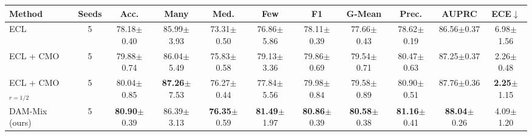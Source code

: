 \begin{tabular}{l c ccccccccc}
\toprule
Method & Seeds & Acc. & Many & Med. & Few & F1 & G-Mean & Prec. & AUPRC & ECE$\downarrow$ \\
\midrule
ECL & 5 & 78.18{\scriptsize$\pm$0.40} & 85.99{\scriptsize$\pm$3.93} & 73.31{\scriptsize$\pm$0.50} & 76.86{\scriptsize$\pm$5.86} & 78.11{\scriptsize$\pm$0.39} & 77.66{\scriptsize$\pm$0.43} & 78.62{\scriptsize$\pm$0.19} & 86.56{\scriptsize$\pm$0.37} & 6.98{\scriptsize$\pm$1.56} \\
ECL + CMO & 5 & 79.88{\scriptsize$\pm$0.74} & 86.04{\scriptsize$\pm$5.49} & 75.83{\scriptsize$\pm$0.58} & 79.13{\scriptsize$\pm$3.36} & 79.86{\scriptsize$\pm$0.69} & 79.54{\scriptsize$\pm$0.71} & 80.47{\scriptsize$\pm$0.63} & 87.25{\scriptsize$\pm$0.37} & 2.26{\scriptsize$\pm$0.48} \\
ECL + CMO$_{r=1/2}$ & 5 & 80.04{\scriptsize$\pm$0.85} & \textbf{87.26}{\scriptsize$\pm$7.53} & 76.27{\scriptsize$\pm$0.44} & 77.84{\scriptsize$\pm$5.56} & 79.98{\scriptsize$\pm$0.84} & 79.58{\scriptsize$\pm$0.89} & 80.90{\scriptsize$\pm$0.51} & 87.76{\scriptsize$\pm$0.36} & \textbf{2.25}{\scriptsize$\pm$1.15} \\
\midrule
DAM-Mix (ours) & 5 & \textbf{80.90}{\scriptsize$\pm$0.39} & 86.39{\scriptsize$\pm$3.13} & \textbf{76.35}{\scriptsize$\pm$0.59} & \textbf{81.49}{\scriptsize$\pm$1.97} & \textbf{80.86}{\scriptsize$\pm$0.39} & \textbf{80.58}{\scriptsize$\pm$0.38} & \textbf{81.16}{\scriptsize$\pm$0.41} & \textbf{88.04}{\scriptsize$\pm$0.26} & 4.09{\scriptsize$\pm$1.20} \\
\bottomrule
\end{tabular}
